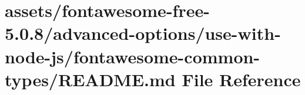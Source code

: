 \hypertarget{fontawesome-free-5_80_88_2advanced-options_2use-with-node-js_2fontawesome-common-types_2_r_e_a_d_m_e_8md}{}\section{assets/fontawesome-\/free-\/5.0.8/advanced-\/options/use-\/with-\/node-\/js/fontawesome-\/common-\/types/\+R\+E\+A\+D\+ME.md File Reference}
\label{fontawesome-free-5_80_88_2advanced-options_2use-with-node-js_2fontawesome-common-types_2_r_e_a_d_m_e_8md}
